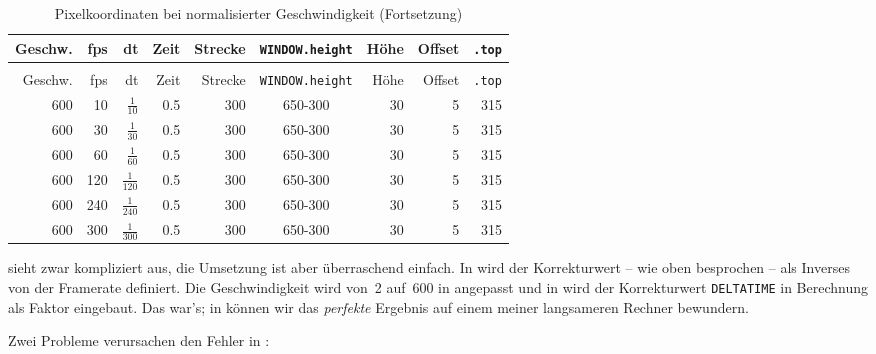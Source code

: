 \begin{longtable}{r@{ * }r@{ * }r@{ * }r@{ = }r@{ $\rightarrow$ }c@{ - }r@{ - }r@{ = }r}%
	\caption{Pixelkoordinaten bei normalisierter Geschwindigkeit}\label{tabFpsBewegung03} \\[1em]
    Geschw. & fps & dt  & Zeit  & Strecke & \texttt{WINDOW.height} & Höhe & Offset & \texttt{.top}\\[0.5em]\hline\hline
	\hline
	\endfirsthead %
	\caption{Pixelkoordinaten bei normalisierter Geschwindigkeit (Fortsetzung)}\\[1em]
    Geschw. & fps & dt  & Zeit  & Strecke & \texttt{WINDOW.height} & Höhe & Offset & \texttt{.top}\\[0.5em]\hline\hline
	\hline
	\endhead %
	600  &   10 &  $\frac{1}{10}$   & 0.5 & 300 & 650-300 & 30 & 5 & 315 \\ \hline
	600  &   30 &  $\frac{1}{30}$   & 0.5 & 300 & 650-300 & 30 & 5 & 315 \\ \hline
	600  &   60 &  $\frac{1}{60}$   & 0.5 & 300 & 650-300 & 30 & 5 & 315 \\ \hline
	600  &  120 &  $\frac{1}{120}$  & 0.5 & 300 & 650-300 & 30 & 5 & 315 \\ \hline
	600  &  240 &  $\frac{1}{240}$  & 0.5 & 300 & 650-300 & 30 & 5 & 315 \\ \hline
	600  &  300 &  $\frac{1}{300}$  & 0.5 & 300 & 650-300 & 30 & 5 & 315 \\ \hline
\end{longtable} 

 sieht zwar kompliziert aus, die Umsetzung ist aber überraschend einfach. In  wird der Korrekturwert -- wie oben besprochen -- als Inverses von der Framerate definiert. Die Geschwindigkeit wird von~2 auf~600 in  angepasst und in  wird der Korrekturwert \texttt{DELTATIME} in Berechnung als Faktor eingebaut. Das war's; in  können wir das \emph{perfekte} Ergebnis auf einem meiner langsameren Rechner bewundern. 


Zwei Probleme verursachen den Fehler in :

